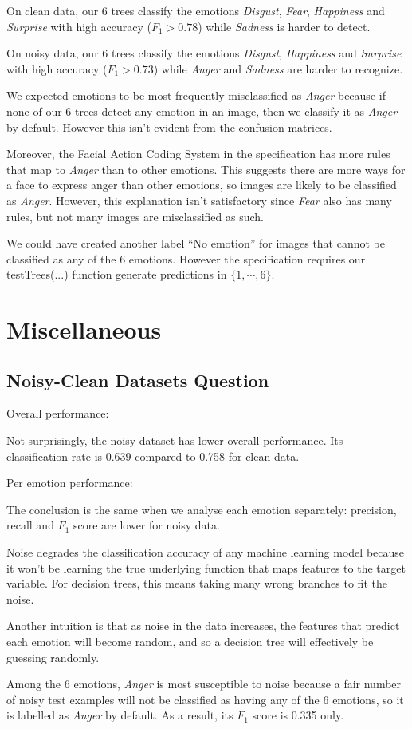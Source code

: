 \documentclass[12pt, a4paper]{article}
\begin{document}
\bigskip
On clean data, our 6 trees classify the emotions \textit{Disgust}, \textit{Fear}, \textit{Happiness} and \textit{Surprise} with high accuracy ($F_1 > 0.78$) while \textit{Sadness} is harder to detect.\par
\bigskip
On noisy data, our 6 trees classify the emotions \textit{Disgust}, \textit{Happiness} and \textit{Surprise} with high accuracy ($F_1 > 0.73$) while \textit{Anger} and \textit{Sadness} are harder to recognize.\par
\bigskip
We expected emotions to be most frequently misclassified as \textit{Anger} because if none of our 6 trees detect any emotion in an image, then we classify it as \textit{Anger} by default. However this isn't evident from the confusion matrices.\par
\bigskip
Moreover, the Facial Action Coding System in the specification has more rules that map to \textit{Anger} than to other emotions. This suggests there are more ways for a face to express anger than other emotions, so images are likely to be classified as \textit{Anger}. However, this explanation isn't satisfactory since \textit{Fear} also has many rules, but not many images are misclassified as such.\par
\bigskip
We could have created another label ``No emotion'' for images that cannot be classified as any of the 6 emotions. However the specification requires our testTrees(...) function generate predictions in $\{1, \dotsm, 6\}$.

\section*{Miscellaneous}
\subsection*{Noisy-Clean Datasets Question}
Overall performance:\par
Not surprisingly, the noisy dataset has lower overall performance. Its classification rate is 0.639 compared to 0.758 for clean data.\par
\bigskip
Per emotion performance:\par
The conclusion is the same when we analyse each emotion separately: precision, recall and $F_1$ score are lower for noisy data.\par
\bigskip
Noise degrades the classification accuracy of any machine learning model because it won't be learning the true underlying function that maps features to the target variable. For decision trees, this means taking many wrong branches to fit the noise.\par
\bigskip
Another intuition is that as noise in the data increases, the features that predict each emotion will become random, and so a decision tree will effectively be guessing randomly.\par
\bigskip
Among the 6 emotions, \textit{Anger} is most susceptible to noise because a fair number of noisy test examples will not be classified as having any of the 6 emotions, so it is labelled as \textit{Anger} by default. As a result, its $F_1$ score is 0.335 only.\par
\bigskip
\end{document}
